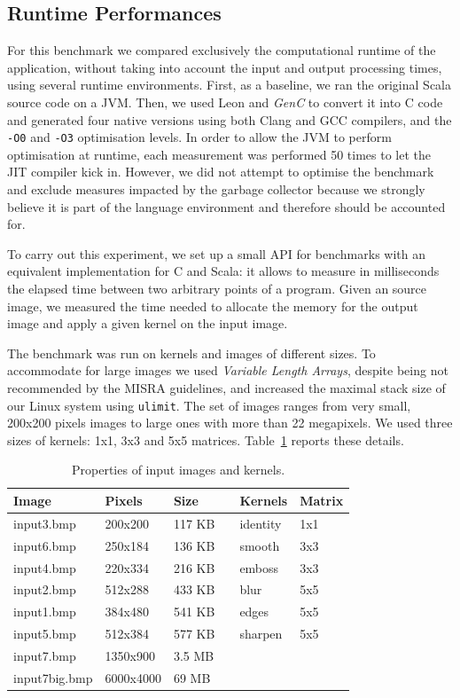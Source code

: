 \documentclass[a4paper,twoside]{article}
\newcommand{\Inline}[1]{\lstinline[basicstyle=\ttfamily]|#1|}
\newcommand{\GenC}{\emph{GenC}\xspace}
\newcommand{\RefTable}[1]{Table~\ref{#1}}
\begin{document}
\subsection{Runtime Performances}

For this benchmark we compared exclusively the computational runtime of the
application, without taking into account the input and output processing times,
using several runtime environments. First, as a baseline, we ran the original
Scala source code on a JVM. Then, we used Leon and \GenC to convert it into C
code and generated four native versions using both Clang and GCC compilers, and
the \Inline{-O0} and \Inline{-O3} optimisation levels. In order to allow the JVM
to perform optimisation at runtime, each measurement was performed 50 times to
let the JIT compiler kick in. However, we did not attempt to optimise the
benchmark and exclude measures impacted by the garbage collector because we
strongly believe it is part of the language environment and therefore should be
accounted for.

To carry out this experiment, we set up a small API for benchmarks with an equivalent
implementation for C and Scala: it allows to measure in milliseconds the elapsed
time between two arbitrary points of a program. Given an source image, we
measured the time needed to allocate the memory for the output image and apply a
given kernel on the input image.

The benchmark was run on kernels and images of different sizes. To accommodate
for large images we used \emph{Variable Length Arrays}, despite being not
recommended by the MISRA guidelines, and increased the maximal stack size of our
Linux system using \Inline{ulimit}. The set of images ranges from very small,
200x200 pixels images to large ones with more than 22 megapixels. We used three
sizes of kernels: 1x1, 3x3 and 5x5 matrices. \RefTable{tab:improc_params}
reports these details.


\begin{table}[h]
\centering
\caption{Properties of input images and kernels.}
\label{tab:improc_params}
\begin{tabular}{@{}lll|l|ll@{}}
\toprule
Image         & Pixels    & Size   &  & Kernels  & Matrix \\ \midrule
input3.bmp    & 200x200   & 117 KB &  & identity & 1x1    \\
input6.bmp    & 250x184   & 136 KB &  & smooth   & 3x3    \\
input4.bmp    & 220x334   & 216 KB &  & emboss   & 3x3    \\
input2.bmp    & 512x288   & 433 KB &  & blur     & 5x5    \\
input1.bmp    & 384x480   & 541 KB &  & edges    & 5x5    \\
input5.bmp    & 512x384   & 577 KB &  & sharpen  & 5x5    \\
input7.bmp    & 1350x900  & 3.5 MB &  &          &        \\
input7big.bmp & 6000x4000 & 69 MB  &  &          &        \\ \bottomrule
\end{tabular}
\end{table}
\end{document}
